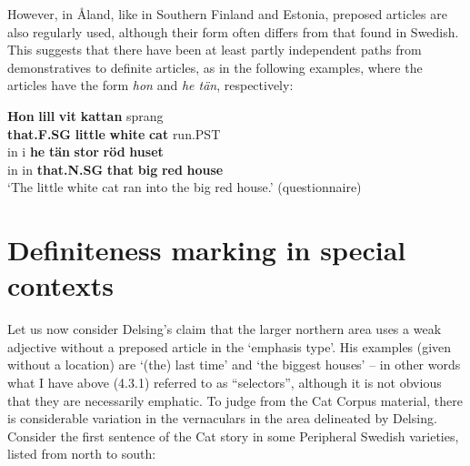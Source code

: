 However, in Åland, like in Southern Finland and Estonia, preposed articles are also regularly used, although their form often differs from that found in Swedish. This suggests that there have been at least partly independent paths from demonstratives to definite articles, as in the following examples, where the articles have the form \textit{hon} and \textit{he tän}, respectively:


\ea\label{}
\gll \textbf{Hon} \textbf{lill} \textbf{vit} \textbf{kattan} sprang\\
\textbf{that.F.SG} \textbf{little} \textbf{white} \textbf{cat} run.PST\\
\gll in  i  \textbf{he} \textbf{tän} \textbf{stor} \textbf{röd} \textbf{huset} \\
in  in  \textbf{that.N.SG} \textbf{that} \textbf{big} \textbf{red} \textbf{house} \\
\glt  ‘The little white cat ran into the big red house.’ (questionnaire)
\z

\section{Definiteness marking in special contexts}

Let us now consider Delsing’s claim that the larger northern area uses a weak adjective without a preposed article in the ‘emphasis type’. His examples (given without a location) are  ‘(the) last time’ and  ‘the biggest houses’ – in other words what I have above (4.3.1) referred to as “selectors”, although it is not obvious that they are necessarily emphatic. To judge from the Cat Corpus material, there is considerable variation in the vernaculars in the area delineated by Delsing. Consider the first sentence of the Cat story in some Peripheral Swedish varieties, listed from north to south:



